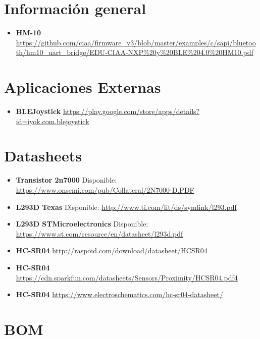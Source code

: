 \section{Información general}

\begin{itemize}
	\item
	\textbf{HM-10} \url{https://github.com/ciaa/firmware\_v3/blob/master/examples/c/sapi/bluetooth/hm10\_uart\_bridge/EDU-CIAA-NXP\%20y\%20BLE\%204.0\%20HM10.pdf}
\end{itemize}

\section{Aplicaciones Externas}

\begin{itemize}
	\item
	\textbf{BLEJoystick} \url{https://play.google.com/store/apps/details?id=iyok.com.blejoystick}
\end{itemize}

\section{Datasheets}

\begin{itemize}
	\item
	\textbf{Transistor 2n7000} Disponible:
	\url{https://www.onsemi.com/pub/Collateral/2N7000-D.PDF}
	\item
	\textbf{L293D Texas } Disponible:
	\url{http://www.ti.com/lit/ds/symlink/l293.pdf}
	\item
	\textbf{L293D STMicroelectronics} Disponible:
	\url{https://www.st.com/resource/en/datasheet/l293d.pdf}
	\item 
	\textbf{HC-SR04} \url{http://raspoid.com/download/datasheet/HCSR04}
	\item 
	\textbf{HC-SR04} \url{https://cdn.sparkfun.com/datasheets/Sensors/Proximity/HCSR04.pdf4}
	\item 
	\textbf{HC-SR04} \url{https://www.electroschematics.com/hc-sr04-datasheet/}
\end{itemize}

\section{BOM}

